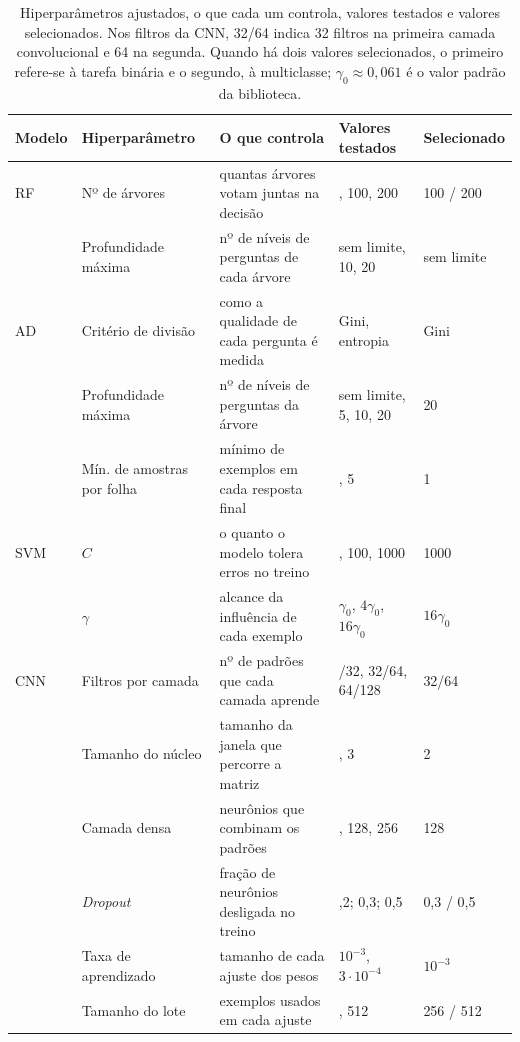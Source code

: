 \documentclass[alpha-refs,brazilian]{CC-EC_TF-TC}
\begin{document}
\begin{table}[t]
\centering
\caption{Hiperparâmetros ajustados, o que cada um controla, valores testados e valores selecionados. Nos filtros da CNN, 32/64 indica 32 filtros na primeira camada convolucional e 64 na segunda. Quando há dois valores selecionados, o primeiro refere-se à tarefa binária e o segundo, à multiclasse; $\gamma_0 \approx 0{,}061$ é o valor padrão da biblioteca.}
\label{tab:hiper}
\small
\setlength{\tabcolsep}{3.5pt}
\begin{tabular}{ll>{\raggedright\arraybackslash}p{}>{\raggedright\arraybackslash}p{}l}
\toprule
\textbf{Modelo} & \textbf{Hiperparâmetro} & \textbf{O que controla} & \textbf{Valores testados} & \textbf{Selecionado} \\
\midrule
RF  & Nº de árvores              & quantas árvores votam juntas na decisão                    & 50, 100, 200 & 100 / 200 \\
    & Profundidade máxima        & nº de níveis de perguntas de cada árvore & sem limite, 10, 20 & sem limite \\
\midrule
AD  & Critério de divisão        & como a qualidade de cada pergunta é medida & Gini, entropia & Gini \\
    & Profundidade máxima        & nº de níveis de perguntas da árvore & sem limite, 5, 10, 20 & 20 \\
    & Mín. de amostras por folha & mínimo de exemplos em cada resposta final & 1, 5 & 1 \\
\midrule
SVM & $C$                        & o quanto o modelo tolera erros no treino                   & 10, 100, 1000 & 1000 \\
    & $\gamma$                   & alcance da influência de cada exemplo & $\gamma_0$, $4\gamma_0$, $16\gamma_0$ & $16\gamma_0$ \\
\midrule
CNN & Filtros por camada         & nº de padrões que cada camada aprende & 16/32, 32/64, 64/128 & 32/64 \\
    & Tamanho do núcleo          & tamanho da janela que percorre a matriz & 2, 3 & 2 \\
    & Camada densa               & neurônios que combinam os padrões & 64, 128, 256 & 128 \\
    & \textit{Dropout}           & fração de neurônios desligada no treino & 0,2; 0,3; 0,5 & 0,3 / 0,5 \\
    & Taxa de aprendizado        & tamanho de cada ajuste dos pesos & $10^{-3}$, $3 \cdot 10^{-4}$ & $10^{-3}$ \\
    & Tamanho do lote            & exemplos usados em cada ajuste & 256, 512 & 256 / 512 \\
\bottomrule
\end{tabular}
\end{table}
\end{document}
